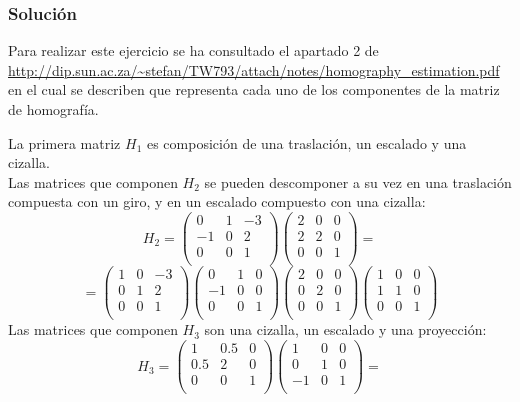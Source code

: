 \subsubsection{Solución}

Para realizar este ejercicio se ha consultado el apartado 2 de \url{http://dip.sun.ac.za/~stefan/TW793/attach/notes/homography_estimation.pdf} en el cual se describen que representa cada uno de los componentes de la matriz de homografía.

La primera matriz $H_1$ es composición de una traslación, un escalado y una cizalla.\\
Las matrices que componen $H_2$ se pueden descomponer a su vez en una traslación compuesta con un giro, y en un escalado compuesto con una cizalla:
\[ H_2 = \left( \begin{array}{lrc}
0 & 1 & -3 \\
-1 & 0 & 2 \\
0 & 0 & 1 \\ \end{array} \right)
\left( \begin{array}{lrc}
2 & 0 & 0 \\
2 & 2 & 0 \\
0 & 0 & 1 \\ \end{array} \right) =\]
\[=  \left( \begin{array}{lrc}
1 & 0 & -3 \\
0 & 1 & 2 \\
0 & 0 & 1 \\ \end{array} \right)
\left( \begin{array}{lrc}
0 & 1 & 0 \\
-1 & 0 & 0 \\
0 & 0 & 1 \\ \end{array} \right)
\left( \begin{array}{lrc}
2 & 0 & 0 \\
0 & 2 & 0 \\
0 & 0 & 1 \\ \end{array} \right)
\left( \begin{array}{lrc}
1 & 0 & 0 \\
1 & 1 & 0 \\
0 & 0 & 1 \\ \end{array} \right)  
\]
Las matrices que componen $H_3$ son una cizalla, un escalado y una proyección:
\[ H_3 = \left( \begin{array}{lrc}
1 & 0.5 & 0 \\
0.5 & 2 & 0 \\
0 & 0 & 1 \\ \end{array} \right)
\left( \begin{array}{lrc}
1 & 0 & 0 \\
0 & 1 & 0 \\
-1 & 0 & 1 \\ \end{array} \right) =\] 
